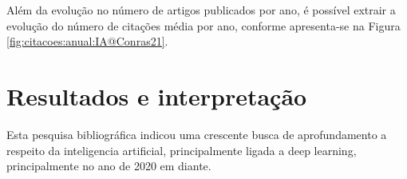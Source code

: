 Além da evolução no número de artigos publicados por ano, é possível extrair a evolução do número de citações média por ano, conforme apresenta-se na Figura \ref{fig:citacoes:anual:IA@Conras21}. 

\section{Resultados e interpretação}

Esta pesquisa bibliográfica indicou uma crescente busca de aprofundamento a respeito da inteligencia artificial, principalmente ligada a deep learning, principalmente no ano de 2020 em diante.